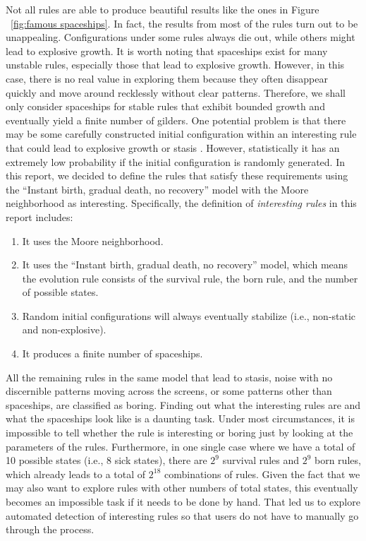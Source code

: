 \documentclass[12pt]{article}
\numberwithin{figure}{section} %
\begin{document}
Not all rules are able to produce beautiful results like the ones in Figure ~\ref{fig:famous spaceships}. In fact, the results from most of the rules turn out to be unappealing. Configurations under some rules always die out, while others might lead to explosive growth. It is worth noting that spaceships exist for many unstable rules, especially those that lead to explosive growth. However, in this case, there is no real value in exploring them because they often disappear quickly and move around recklessly without clear patterns. Therefore, we shall only consider spaceships for stable rules that exhibit bounded growth and eventually yield a finite number of gilders. One potential problem is that there may be some carefully constructed initial configuration within an interesting rule that could lead to explosive growth or stasis \cite{Gliders in Cellular Automata}. However, statistically it has an extremely low probability if the initial configuration is randomly generated. In this report, we decided to define the rules that satisfy these requirements using the “Instant birth, gradual death, no recovery” model with the Moore neighborhood as interesting. Specifically, the definition of \textit{interesting rules} in this report includes: 
\begin{enumerate}[topsep=0pt,itemsep=-1ex,partopsep=1ex,parsep=1ex]
\item It uses the Moore neighborhood. 
\item It uses the “Instant birth, gradual death, no recovery” model, which means the evolution rule consists of the survival rule, the born rule, and the number of possible states. 
\item Random initial configurations will always eventually stabilize (i.e., non-static and non-explosive). 
\item It produces a finite number of spaceships. 
\end{enumerate}

All the remaining rules in the same model that lead to stasis, noise with no discernible patterns moving across the screens, or some patterns other than spaceships, are classified as boring. Finding out what the interesting rules are and what the spaceships look like is a daunting task. Under most circumstances, it is impossible to tell whether the rule is interesting or boring just by looking at the parameters of the rules. Furthermore, in one single case where we have a total of 10 possible states (i.e., 8 sick states), there are $2^9$ survival rules and $2^9$ born rules, which already leads to a total of $2^{18}$ combinations of rules. Given the fact that we may also want to explore rules with other numbers of total states, this eventually becomes an impossible task if it needs to be done by hand. That led us to explore automated detection of interesting rules so that users do not have to manually go through the process. 
\end{document}
